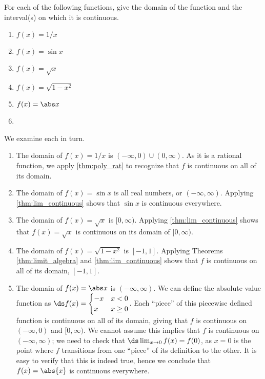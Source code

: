 \begin{example}\label{ex_cont_funct1}
For each of the following functions, give the domain of the function and the interval(s) on which it is continuous.
\begin{multicols}{2}
	\begin{enumerate}
		\item	$f(x) = 1/x$
		\item	$f(x) = \sin x$
		\item	$f(x) = \sqrt{x}$
		\item	$f(x) = \sqrt{1-x^2}$
		\item	$f(x) = \abs x$
		\item[]
	\end{enumerate}
\end{multicols}
\solution
We examine each in turn.
\begin{enumerate}
	\item	The domain of $f(x) = 1/x$ is $(-\infty,0) \cup (0,\infty)$. As it is a rational function, we apply \autoref{thm:poly_rat} to recognize that $f$ is continuous on all of its domain.
	\item	The domain of $f(x) = \sin x$ is all real numbers, or $(-\infty,\infty)$. Applying \autoref{thm:lim_continuous} shows that $\sin x$ is continuous everywhere.
	\item	The domain of $f(x) = \sqrt{x}$ is $[0,\infty)$. Applying \autoref{thm:lim_continuous} shows that $f(x) = \sqrt{x}$ is continuous on its domain of $[0,\infty)$.
	\item	The domain of $f(x) = \sqrt{1-x^2}$ is $[-1,1]$. Applying Theorems \ref{thm:limit_algebra} and \ref{thm:lim_continuous} shows that $f$ is continuous on all of its domain, $[-1,1]$.
	\item	The domain of $f(x) = \abs x$ is $(-\infty,\infty)$. We can define the absolute value function as $\ds f(x) = \begin{cases}-x & x<0 \\ x & x\geq 0\end{cases}$. Each ``piece'' of this piecewise defined function is continuous on all of its domain, giving that $f$ is continuous on $(-\infty,0)$ and $[0,\infty)$. We cannot assume this implies that $f$ is continuous on $(-\infty,\infty)$; we need to check that $\ds \lim_{x\to 0}f(x) = f(0)$, as $x=0$ is the point where $f$ transitions from one ``piece'' of its definition to the other. It is easy to verify that this is indeed true, hence we conclude that $f(x) = \abs{x}$ is continuous everywhere.
\end{enumerate}
\end{example}

